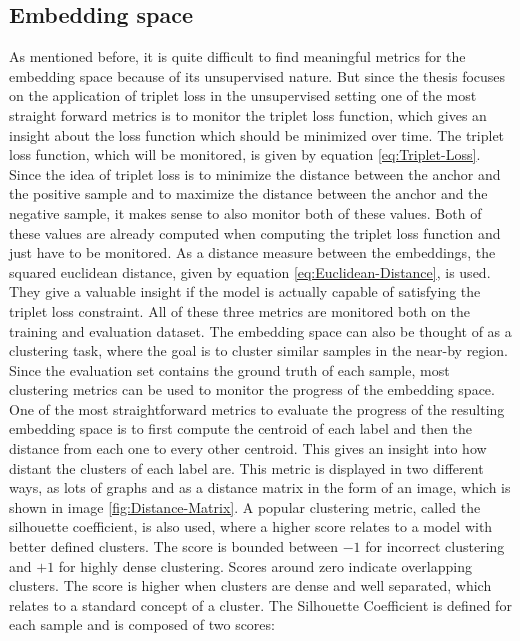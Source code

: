 \subsection{Embedding space}
\label{sub:Metrics-Embedding-Space}
As mentioned before, it is quite difficult to find meaningful metrics for the embedding space because of its unsupervised nature. But since the thesis focuses on the application of triplet loss in the unsupervised setting one of the most straight forward metrics is to monitor the triplet loss function, which gives an insight about the loss function which should be minimized over time. The triplet loss function, which will be monitored, is given by equation \ref{eq:Triplet-Loss}. Since the idea of triplet loss is to minimize the distance between the anchor and the positive sample and to maximize the distance between the anchor and the negative sample, it makes sense to also monitor both of these values. Both of these values are already computed when computing the triplet loss function and just have to be monitored. As a distance measure between the embeddings, the squared euclidean distance, given by equation \ref{eq:Euclidean-Distance}, is used. They give a valuable insight if the model is actually capable of satisfying the triplet loss constraint. All of these three metrics are monitored both on the training and evaluation dataset.
\newline
\newline
The embedding space can also be thought of as a clustering task, where the goal is to cluster similar samples in the near-by region. Since the evaluation set contains the ground truth of each sample, most clustering metrics can be used to monitor the progress of the embedding space. 
\newline
\newline
One of the most straightforward metrics to evaluate the progress of the resulting embedding space is to first compute the centroid of each label and then the distance from each one to every other centroid. This gives an insight into how distant the clusters of each label are. This metric is displayed in two different ways, as lots of graphs and as a distance matrix in the form of an image, which is shown in image \ref{fig:Distance-Matrix}.
\newline
\newline
A popular clustering metric, called the silhouette coefficient, is also used, where a higher score relates to a model with better defined clusters. The score is bounded between $-1$ for incorrect clustering and $+1$ for highly dense clustering. Scores around zero indicate overlapping clusters. The score is higher when clusters are dense and well separated, which relates to a standard concept of a cluster. The Silhouette Coefficient is defined for each sample and is composed of two scores:
